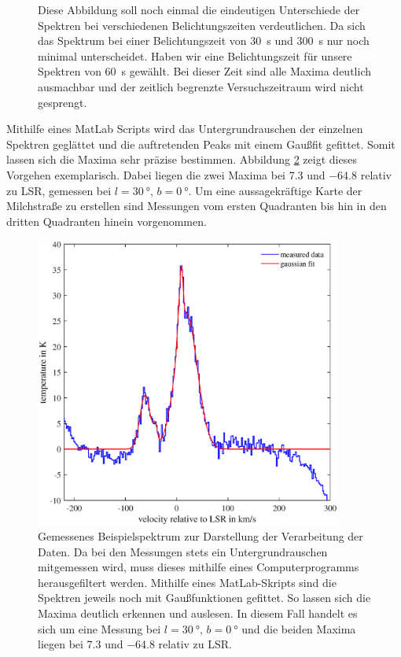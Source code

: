 \begin{figure}[H]
    \centering
       
    \caption[Eindeutigen Unterschiede der Spektren bei verschiedenen Belichtungszeiten]{Diese Abbildung soll noch einmal die eindeutigen Unterschiede der Spektren bei verschiedenen Belichtungszeiten verdeutlichen. Da sich das Spektrum bei einer Belichtungszeit von \SI{30}{s} und \SI{300}{s} nur noch minimal unterscheidet. Haben wir eine Belichtungszeit für unsere Spektren von \SI{60}{s} gewählt. Bei dieser Zeit sind alle Maxima deutlich ausmachbar und der zeitlich begrenzte Versuchszeitraum wird nicht gesprengt.}
    \label{fig:BelichtungszeitExtremal}
\end{figure}
Mithilfe eines MatLab Scripts wird das Untergrundrauschen der einzelnen Spektren geglättet und die auftretenden Peaks mit einem Gaußfit gefittet. Somit lassen sich die Maxima sehr präzise bestimmen. Abbildung \ref{fig:TestBaseline} zeigt dieses Vorgehen exemplarisch. Dabei liegen die zwei Maxima bei \SI{7.3}{} und \SI{-64.8}{} relativ zu LSR, gemessen bei $l = \SI{30}{\degree}, \, b = \SI{0}{\degree}$. Um eine aussagekräftige Karte der Milchstraße zu erstellen sind Messungen vom ersten Quadranten bis hin in den dritten Quadranten hinein vorgenommen.
\begin{figure}[H]
    \centering
    \includegraphics[width= 0.9\textwidth]{plots/TestBaseline.eps}
    \caption[Gemessenes Beispielspektrum zur Darstellung der Verarbeitung der Daten]{Gemessenes Beispielspektrum zur Darstellung der Verarbeitung der Daten. Da bei den Messungen stets ein Untergrundrauschen mitgemessen wird, muss dieses mithilfe eines Computerprogramms herausgefiltert werden. Mithilfe eines MatLab-Skripts sind die Spektren jeweils noch mit Gaußfunktionen gefittet. So lassen sich die Maxima deutlich erkennen und auslesen. In diesem Fall handelt es sich um eine Messung bei $l = \SI{30}{\degree}, \, b = \SI{0}{\degree}$ und die beiden Maxima liegen bei \SI{7.3}{} und \SI{-64.8}{} relativ zu LSR.}
    \label{fig:TestBaseline}
\end{figure}
